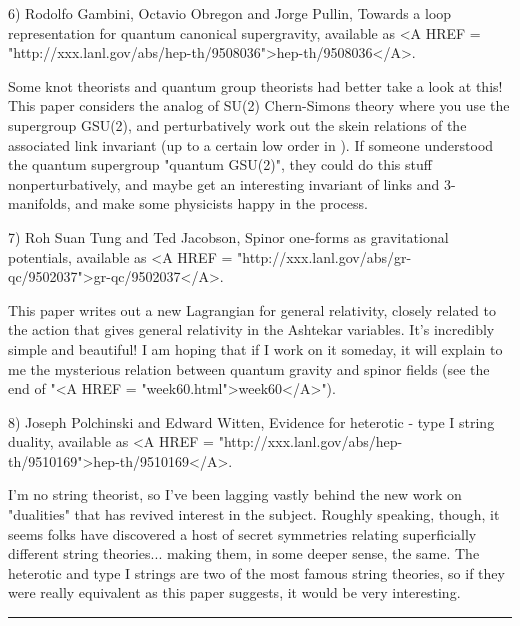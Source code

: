 6) Rodolfo Gambini, Octavio Obregon and Jorge Pullin, Towards a loop
representation for quantum canonical supergravity, available as
<A HREF = "http://xxx.lanl.gov/abs/hep-th/9508036">hep-th/9508036</A>. 

Some knot theorists and quantum group theorists had better take a look at
this!  This paper considers the analog of SU(2) Chern-Simons theory
where you use the supergroup GSU(2), and perturbatively work out the
skein relations of the associated link invariant (up to a certain low
order in \hbar ).  If someone understood the quantum supergroup "quantum
GSU(2)", they could do this stuff nonperturbatively, and maybe get an
interesting invariant of links and 3-manifolds, and make some physicists
happy in the process.

7) Roh Suan Tung and Ted Jacobson, Spinor one-forms as gravitational
potentials, available as <A HREF = "http://xxx.lanl.gov/abs/gr-qc/9502037">gr-qc/9502037</A>.

This paper writes out a new Lagrangian for general relativity, closely
related to the action that gives general relativity in the Ashtekar
variables.  It's incredibly simple and beautiful!  I am hoping that if I
work on it someday, it will explain to me the mysterious relation
between quantum gravity and spinor fields (see the end of "<A HREF = "week60.html">week60</A>").  

8) Joseph Polchinski and Edward Witten, Evidence for heterotic - type I
string duality, available as <A HREF = "http://xxx.lanl.gov/abs/hep-th/9510169">hep-th/9510169</A>.

I'm no string theorist, so I've been lagging vastly behind the new work
on "dualities" that has revived interest in the subject.  Roughly
speaking, though, it seems folks have discovered a host of secret
symmetries relating superficially different string theories... making
them, in some deeper sense, the same.  The heterotic and type I strings
are two of the most famous string theories, so if they were really
equivalent as this paper suggests, it would be very interesting.


\par\noindent\rule{\textwidth}{0.4pt}


